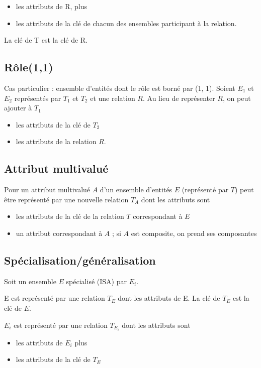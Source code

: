 	 \begin{itemize}
	 	\item les attributs de R, plus
	 	\item les attributs de la clé de chacun des ensembles participant à la relation.
	 \end{itemize}
	  La clé de T est la clé de R.
	 
	 	\subsection{Rôle(1,1)}
	 Cas particulier : ensemble d'entités dont le rôle est borné par (1, 1). Soient $E_1$ et $E_2$ représentés par $T_1$ et $T_2$ et une relation $R$. Au lieu de représenter $R$, on peut ajouter à $T_1$
	 
	 \begin{itemize}
	 	\item les attributs de la clé de $T_2$
	 	\item les attributs de la relation $R$.
	 \end{itemize}
	 
	 
	 	\subsection{Attribut multivalué}
	Pour un attribut multivalué $A$ d'un ensemble d'entités $E$ (représenté par $T$) peut être représenté par une nouvelle relation $T_A$ dont les attributs sont
	
	\begin{itemize}
		\item les attributs de la clé de la relation $T$ correspondant à $E$
		\item un attribut correspondant à $A$ ; si $A$ est composite, on prend ses composantes
	\end{itemize}
	 
	 	\subsection{Spécialisation/généralisation}
	 	
		Soit un ensemble $E$ spécialisé (ISA) par $E_i$.
		
		E est représenté par une relation $T_E$ dont les attributs de E. La clé de $T_E$ est la clé de $E$.
		
		$E_i$ est représenté par une relation $T_{E_i}$ dont les attributs sont
		
		\begin{itemize}	
			\item les attributs de $E_i$ plus
			\item les attributs de la clé de $T_E$
		\end{itemize}
		
